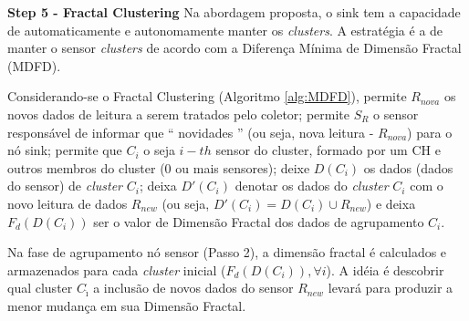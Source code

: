 \documentclass{acm_proc_article-sp}
\begin{document}
{\bf Step 5 - Fractal Clustering}
Na abordagem proposta, o sink tem a capacidade de automaticamente e 
autonomamente manter os {\it clusters}. A estratégia é a de manter o sensor 
{\it clusters} de acordo com a Diferença Mínima de Dimensão Fractal (MDFD).
\vspace*{-.3cm}

Considerando-se o Fractal Clustering (Algoritmo \ref {alg:MDFD}),
permite $R_{nova}$ os novos dados de leitura a serem tratados pelo coletor;
permite $S_{R}$ o sensor responsável de informar que `` novidades ''
(ou seja, nova leitura - $ R_{nova}$) para o nó sink; permite que $C_i$  o
seja $i-th$ sensor do cluster, formado por um CH e outros membros do cluster
(0 ou mais sensores); deixe $D(C_i)$ os dados (dados do sensor) de 
{\it cluster} $C_i$; deixa $D'(C_i)$ denotar os dados do {\it cluster} $C_i$ com
o novo leitura de dados $R_{new}$ (ou seja, $D'(C_i) = D(C_i) \cup R_{new}$) 
e deixa $F_{d}(D(C_i))$ ser o valor de Dimensão Fractal dos dados de
agrupamento $C_i$.
\vspace*{-.3cm}

Na fase de agrupamento nó sensor (Passo 2), a dimensão fractal é 
calculados e armazenados para cada {\it cluster} inicial 
($F_{d}(D(C_i)), \forall i$). A idéia é descobrir qual cluster
$C_{\hat{\imath}}$ a inclusão de novos dados do sensor $R_{new}$
levará para produzir a menor mudança em sua Dimensão Fractal.
\vspace*{-.3cm}
\end{document}
